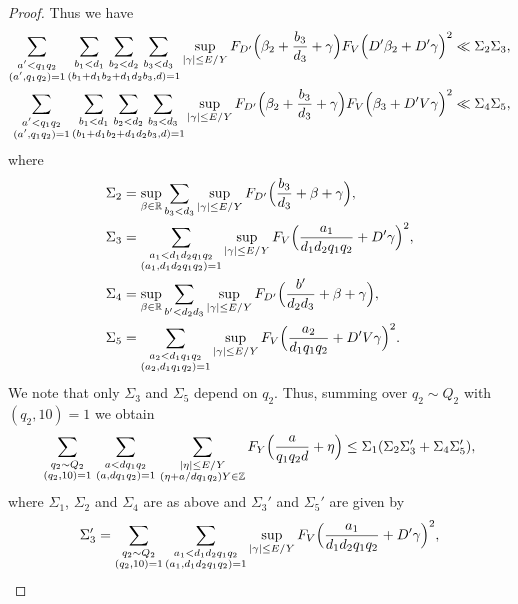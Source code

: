 \documentclass[10pt]{amsart}
\theoremstyle{plain}
\numberwithin{sblmm}{thrm}
\numberwithin{equation}{section}
\begin{document}
\begin{proof}
Thus we have
\begin{align*}
 \sum_{\substack{a'< q_1q_2\\ (a',q_1q_2)=1}}\underset{(b_1+d_1b_2+d_1d_2b_3,d)=1}{\sum_{b_1< d_1}\,\sum_{b_2< d_2}\,\sum_{b_3< d_3}}\sup_{|\gamma|\le E/Y}F_{D'}\Bigl(\beta_2+\frac{b_3}{d_3}+\gamma\Bigr)F_V\Bigl(D'\beta_2+D' \gamma\Bigr)^2\ll \Sigma_2\Sigma_3,\nonumber\\
\sum_{\substack{a'< q_1q_2\\ (a',q_1q_2)=1}}\underset{(b_1+d_1b_2+d_1d_2b_3,d)=1}{\sum_{b_1< d_1}\,\sum_{b_2< d_2}\,\sum_{b_3< d_3}}\sup_{|\gamma|\le E/Y}F_{D'}\Bigl(\beta_2+\frac{b_3}{d_3}+\gamma\Bigr)F_V\Big(\beta_3+D' V\gamma\Bigr)^2\ll \Sigma_4\Sigma_5,
\end{align*}
where 
%
\begin{align*}
\Sigma_2&=\sup_{\beta\in\mathbb{R}}\sum_{b_3< d_3}\sup_{|\gamma|\le E/Y}F_{D'}\Bigl(\frac{b_3}{d_3}+\beta+\gamma\Bigr),\\
\Sigma_3&=\sum_{\substack{a_1< d_1d_2q_1q_2\\ (a_1,d_1d_2q_1q_2)=1}}\sup_{|\gamma|\le E/Y}F_{V}\Bigl(\frac{a_1}{d_1d_2q_1q_2}+D'\gamma\Bigr)^2,\\
\Sigma_4&=\sup_{\beta\in\mathbb{R}}\sum_{b'< d_2d_3}\sup_{|\gamma|\le E/Y}F_{D'}\Bigl(\frac{b'}{d_2d_3}+\beta+\gamma\Bigr),\\
\Sigma_5&=\sum_{\substack{a_2< d_1q_1q_2\\ (a_2,d_1q_1q_2)=1}}\sup_{|\gamma|\le E/Y}F_V\Bigl(\frac{a_2}{d_1q_1q_2}+D' V\gamma\Bigr)^2.
\end{align*}
We note that only $\Sigma_3$ and $\Sigma_5$ depend on $q_2$. Thus, summing over $q_2\sim Q_2$ with $(q_2,10)=1$ we obtain
%
\begin{equation}
\sum_{\substack{q_2\sim Q_2\\ (q_2,10)=1}}\,\sum_{\substack{a< d q_1q_2\\ (a,d q_1q_2)=1}}\,\sum_{\substack{|\eta|\le E/Y\\ (\eta+a/d q_1q_2)Y\in\mathbb{Z}}}F_Y\Bigl(\frac{a}{q_1q_2d}+\eta\Bigr)\le \Sigma_1(\Sigma_2\Sigma_3'+\Sigma_4\Sigma_5'),
\label{eq:HybridBound}
\end{equation}
%
where $\Sigma_1$, $\Sigma_2$ and $\Sigma_4$ are as above and $\Sigma_3'$ and $\Sigma_5'$ are given by
%
\begin{align*}
\Sigma_3'&=\sum_{\substack{q_2\sim Q_2\\ (q_2,10)=1}}\sum_{\substack{a_1< d_1d_2q_1q_2\\ (a_1,d_1d_2q_1q_2)=1}}\sup_{|\gamma|\le E/Y}F_{V}\Bigl(\frac{a_1}{d_1d_2q_1q_2}+D'\gamma\Bigr)^2,\\

\end{align*}
\end{proof}
\end{document}
